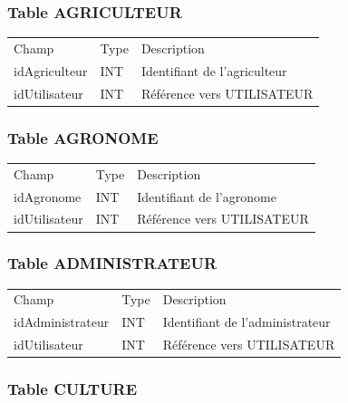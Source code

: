 \hypertarget{table-agriculteur}{%
\subsubsection{Table AGRICULTEUR}\label{table-agriculteur}}

\begin{longtable}[]{@{}lll@{}}
\toprule
\endhead
Champ & Type & Description \\
idAgriculteur & INT & Identifiant de l'agriculteur \\
idUtilisateur & INT & Référence vers UTILISATEUR \\
\bottomrule
\end{longtable}

\hypertarget{table-agronome}{%
\subsubsection{Table AGRONOME}\label{table-agronome}}

\begin{longtable}[]{@{}lll@{}}
\toprule
\endhead
Champ & Type & Description \\
idAgronome & INT & Identifiant de l'agronome \\
idUtilisateur & INT & Référence vers UTILISATEUR \\
\bottomrule
\end{longtable}

\hypertarget{table-administrateur}{%
\subsubsection{Table ADMINISTRATEUR}\label{table-administrateur}}

\begin{longtable}[]{@{}lll@{}}
\toprule
\endhead
Champ & Type & Description \\
idAdministrateur & INT & Identifiant de l'administrateur \\
idUtilisateur & INT & Référence vers UTILISATEUR \\
\bottomrule
\end{longtable}

\hypertarget{table-culture}{%
\subsubsection{Table CULTURE}\label{table-culture}}

